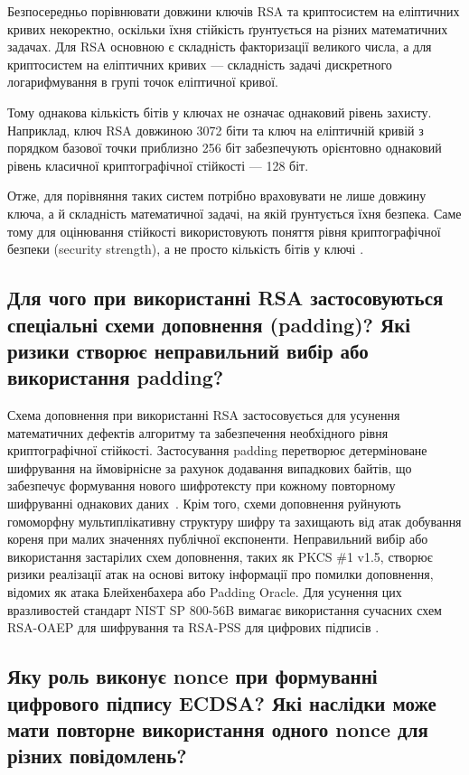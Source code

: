 Безпосередньо порівнювати довжини ключів RSA та криптосистем на еліптичних кривих некоректно, оскільки їхня стійкість ґрунтується на різних математичних задачах. 
Для RSA основною є складність факторизації великого числа, а для криптосистем на еліптичних кривих — складність задачі дискретного логарифмування в групі точок еліптичної кривої.

Тому однакова кількість бітів у ключах не означає однаковий рівень захисту. Наприклад, ключ RSA довжиною 3072 біти та ключ на еліптичній кривій з 
порядком базової точки приблизно 256 біт забезпечують орієнтовно однаковий рівень класичної криптографічної стійкості — 128 біт.

Отже, для порівняння таких систем потрібно враховувати не лише довжину ключа, а й складність математичної задачі, на якій ґрунтується їхня безпека. 
Саме тому для оцінювання стійкості використовують поняття рівня криптографічної безпеки (security strength), а не просто кількість бітів у ключі \cite{NIST80057}.


\subsection{Для чого при використанні RSA застосовуються спеціальні схеми доповнення (padding)? Які ризики створює неправильний вибір або використання padding?}

Схема доповнення при використанні RSA застосовується для усунення математичних дефектів алгоритму та
забезпечення необхідного рівня криптографічної стійкості. Застосування padding перетворює детерміноване
шифрування на ймовірнісне за рахунок додавання випадкових байтів, що забезпечує формування нового
шифротексту при кожному повторному шифруванні однакових даних~\cite{RFC8017}. Крім того, схеми
доповнення руйнують гомоморфну мультиплікативну структуру шифру та захищають від атак добування
кореня при малих значеннях публічної експоненти. Неправильний вибір або використання застарілих схем
доповнення, таких як PKCS \#1 v1.5, створює ризики реалізації атак на основі витоку інформації про помилки
доповнення, відомих як атака Блейхенбахера або Padding Oracle. Для усунення цих вразливостей стандарт
NIST SP 800-56B вимагає використання сучасних схем RSA-OAEP для шифрування та RSA-PSS для цифрових
підписів \cite{RFC8017,NIST80056B}.

\subsection{Яку роль виконує nonce при формуванні цифрового підпису ECDSA? Які наслідки може мати повторне використання одного nonce для різних повідомлень?}

